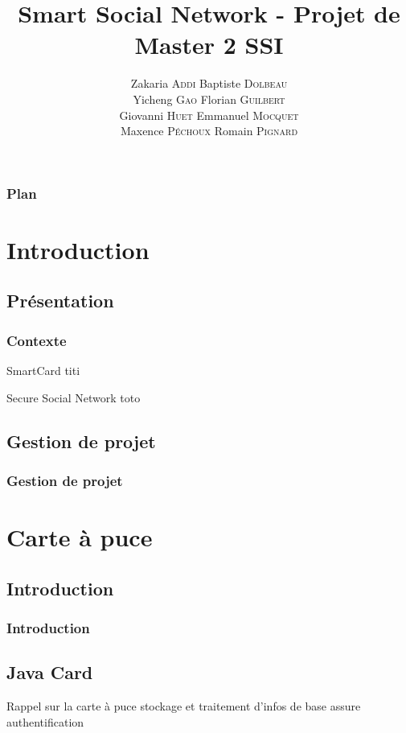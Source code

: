 \documentclass{beamer}
\title{Smart Social Network - Projet de Master 2 SSI}
\author{
    Zakaria \textsc{Addi}
    Baptiste \textsc{Dolbeau}\\
    Yicheng \textsc{Gao}
    Florian \textsc{Guilbert}\\
    Giovanni \textsc{Huet}
    Emmanuel \textsc{Mocquet}\\
    Maxence \textsc{Péchoux}
    Romain \textsc{Pignard}
}
\institute{Université de Rouen}
\begin{document}
\begin{frame}
\titlepage 
\end{frame}

\begin{frame}
\frametitle{Plan}
\tableofcontents[hideallsubsections]
\end{frame}

\section{Introduction}

\subsection{Présentation}
\begin{frame}
    \frametitle{Contexte}
    \begin{block}{SmartCard}
        titi
    \end{block}
    \begin{block}{Secure Social Network}
        toto
    \end{block}
\end{frame}

\subsection{Gestion de projet}
\begin{frame}
    \frametitle{Gestion de projet}
    \begin{block}{ }
    \end{block}
\end{frame}

\section{Carte à puce}

\subsection{Introduction}
\begin{frame}
    \frametitle{Introduction}
    \begin{block}{}
    \end{block}
\end{frame}

\subsection{Java Card}
\begin{frame}
    \begin{block}{Rappel sur la carte à puce}
        stockage et traitement d'infos
        de base assure authentification
    \end{block}
\end{frame}
\end{document}
